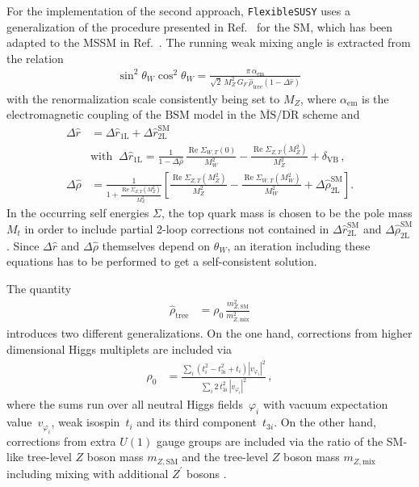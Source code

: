 \documentclass[final,3p,11pt,pdflatex]{elsarticle}
\makeatletter
\newcommand{\fs}{\texttt{FlexibleSUSY}\@\xspace}
\newcommand{\ol}[1]{\overline{#1}}
\newcommand{\MSbar}{\ensuremath{\ol{\text{MS}}}\xspace}
\newcommand{\DRbar}{\ensuremath{\ol{\text{DR}}}\xspace}
\newcommand{\SM}{\ensuremath{\text{SM}}\xspace}
\newcommand{\BSM}{\ensuremath{\text{BSM}}\xspace}
\newcommand{\deltaVB}{\ensuremath{\delta_{\text{VB}}}\xspace}
\DeclareMathOperator{\re}{Re}
\def\aem{\alpha_{\text{em}}}
\makeatother
\begin{document}
For the implementation of the second approach, \fs uses a
generalization of the procedure presented in Ref.~\cite{Degrassi:1990tu}
for the SM, which has been adapted to the MSSM in Ref.~\cite{Pierce:1996zz}.
The running weak mixing angle is extracted from the relation
\cite{Degrassi:1990tu}
%
\begin{align}
  \sin^2\theta_W \cos^2\theta_W =
  \frac{\pi\,\aem}
   {\sqrt{2}\,M_Z^2\,G_F\,\hat\rho_\text{tree} \left(1-\Delta\hat{r}\right)}\,
  \label{eq:muon_decay_master}
\end{align}
%
with the renormalization scale consistently being set to $M_Z$,
where $\aem$ is the electromagnetic coupling of the \BSM model in the
\MSbar/\DRbar scheme and
%
\begin{align}
  \Delta\hat{r} &= \Delta\hat{r}_\text{1L} + \Delta\hat{r}_\text{2L}^\SM \\
  &\text{with}\;\;
  \Delta\hat{r}_\text{1L} = \frac{1}{1-\Delta\hat\rho}\,\frac{\re\Sigma_{W,T}(0)}{M_W^2}
  - \frac{\re\Sigma_{Z,T}(M_Z^2)}{M_Z^2} + \deltaVB\,,
  \label{eq:Delta_r_hat}\\
  \Delta\hat\rho &= \frac{1}{1 + \frac{\re\Sigma_{Z,T}(M_Z^2)}{M_Z^2}}
  \left[\frac{\re\Sigma_{Z,T}(M_Z^2)}{M_Z^2} - \frac{\re\Sigma_{W,T}(M_W^2)}{M_W^2}
   + \Delta\hat\rho_\text{2L}^\SM\right].
   \label{eq:Delta_rho_hat}
\end{align}
%
In the occurring self energies $\Sigma$, the top quark mass is chosen
to be the pole mass $M_t$ in order to include partial 2-loop corrections not
contained in $\Delta\hat{r}_\text{2L}^\SM$ and $\Delta\hat\rho_\text{2L}^\SM$
\cite{Fanchiotti:1992tu}.
Since $\Delta\hat{r}$ and $\Delta\hat\rho$ themselves depend
on $\theta_W$, an iteration including these equations has to be
performed to get a self-consistent solution.

The quantity
%
\begin{align}
  \hat\rho_\text{tree} &= \rho_0\,\frac{m_{Z,\SM}^2}{m_{Z,\text{mix}}^2}
  \label{eq:rho_hat_tree}
\end{align}
%
introduces two different generalizations. On the one hand, corrections
from higher dimensional Higgs multiplets are included via \cite{Langacker:1991an}
%
\begin{align}
  \rho_0 &= \frac{\sum_i \left(t_i^2 - t_{3i}^2 + t_i \right)|v_{\varphi_i}|^2}
   {\sum_i 2\,t_{3i}^2\,|v_{\varphi_i}|^2}\,,
\end{align}
%
where the sums run over all neutral Higgs fields~$\varphi_i$ with vacuum
expectation value~$v_{\varphi_i}$, weak isospin~$t_i$ and its third
component~$t_{3i}$. On the other hand, corrections from extra $U(1)$
gauge groups are included via the ratio of the SM-like tree-level $Z$
boson mass $m_{Z,\SM}$ and the tree-level $Z$ boson mass $m_{Z,\text{mix}}$
including mixing with additional $Z^\prime$ bosons
\cite{Degrassi:1989mu,Leike:1991if}.
\end{document}
